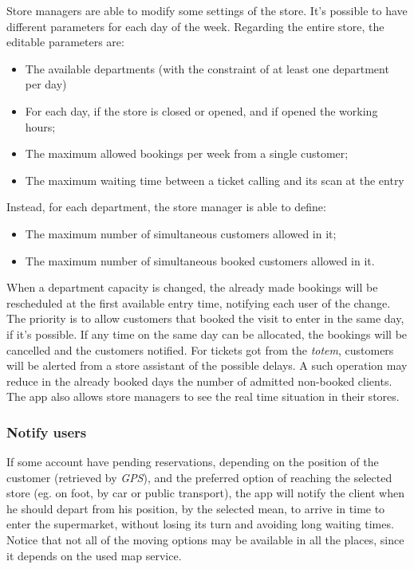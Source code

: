 \documentclass{article}
\begin{document}
		Store managers are able to modify some settings of the store. It's possible to have different parameters for each day of the week. Regarding the entire store, the editable parameters are:
		\begin{itemize}
			\item The available departments (with the constraint of at least one department per day)
			\item For each day, if the store is closed or opened, and if opened the working hours;
			\item The maximum allowed bookings per week from a single customer;
			\item The maximum waiting time between a ticket calling and its scan at the entry
		\end{itemize}
	
		Instead, for each department, the store manager is able to define:
		\begin{itemize}
			\item The maximum number of simultaneous customers allowed in it;
			\item The maximum number of simultaneous booked customers allowed in it.
		\end{itemize}
	 When a department capacity is changed, the already made bookings will be rescheduled at the first available entry time, notifying each user of the change. The priority is to allow customers that booked the visit to enter in the same day, if it's possible. If any time on the same day can be allocated, the bookings will be cancelled and the customers notified. For tickets got from the \emph{totem}, customers will be alerted from a store assistant of the possible delays. A such operation may reduce in the already booked days the number of admitted non-booked clients. 
	 The app also allows store managers to see the real time situation in their stores.
	
		\subsubsection{Notify users}
		
		If some account have pending reservations, depending on the position of the customer (retrieved by \emph{GPS}), and the preferred option of reaching the selected store (eg. on foot, by car or public transport), the app will notify the client when he should depart from his position, by the selected mean, to arrive in time to enter the supermarket, without losing its turn and avoiding long waiting times. Notice that not all of the moving options may be available in all the places, since it depends on the used map service.
		
\end{document}
